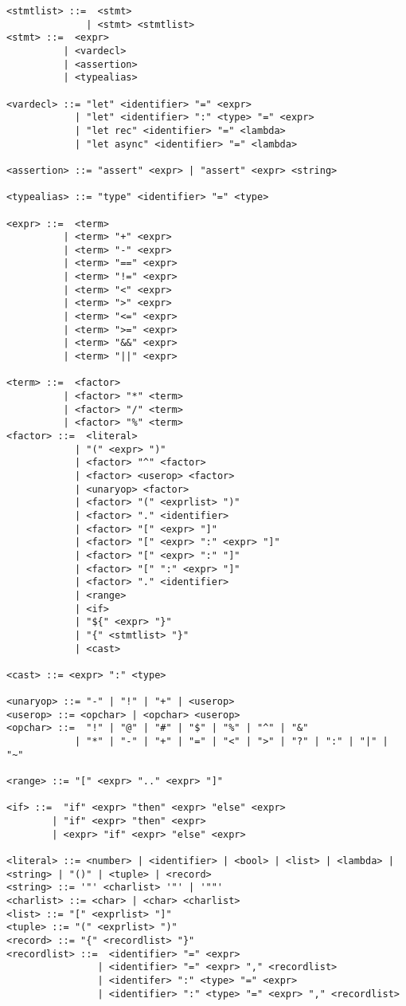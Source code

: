 \begin{verbatim}
<stmtlist> ::=  <stmt> 
              | <stmt> <stmtlist>
<stmt> ::=  <expr> 
          | <vardecl>
          | <assertion>
          | <typealias>

<vardecl> ::= "let" <identifier> "=" <expr>
            | "let" <identifier> ":" <type> "=" <expr>
            | "let rec" <identifier> "=" <lambda>
            | "let async" <identifier> "=" <lambda>

<assertion> ::= "assert" <expr> | "assert" <expr> <string>

<typealias> ::= "type" <identifier> "=" <type>

<expr> ::=  <term> 
          | <term> "+" <expr> 
          | <term> "-" <expr>
          | <term> "==" <expr>
          | <term> "!=" <expr>
          | <term> "<" <expr>
          | <term> ">" <expr>
          | <term> "<=" <expr>
          | <term> ">=" <expr>
          | <term> "&&" <expr>
          | <term> "||" <expr>
            
<term> ::=  <factor> 
          | <factor> "*" <term> 
          | <factor> "/" <term> 
          | <factor> "%" <term> 
<factor> ::=  <literal> 
            | "(" <expr> ")" 
            | <factor> "^" <factor>
            | <factor> <userop> <factor>
            | <unaryop> <factor>
            | <factor> "(" <exprlist> ")"
            | <factor> "." <identifier>
            | <factor> "[" <expr> "]"
            | <factor> "[" <expr> ":" <expr> "]"
            | <factor> "[" <expr> ":" "]"
            | <factor> "[" ":" <expr> "]"
            | <factor> "." <identifier>
            | <range>
            | <if>
            | "${" <expr> "}"
            | "{" <stmtlist> "}"
            | <cast>

<cast> ::= <expr> ":" <type>

<unaryop> ::= "-" | "!" | "+" | <userop>
<userop> ::= <opchar> | <opchar> <userop>
<opchar> ::=  "!" | "@" | "#" | "$" | "%" | "^" | "&" 
            | "*" | "-" | "+" | "=" | "<" | ">" | "?" | ":" | "|" | "~"

<range> ::= "[" <expr> ".." <expr> "]"

<if> ::=  "if" <expr> "then" <expr> "else" <expr>
        | "if" <expr> "then" <expr>
        | <expr> "if" <expr> "else" <expr>

<literal> ::= <number> | <identifier> | <bool> | <list> | <lambda> | <string> | "()" | <tuple> | <record>
<string> ::= '"' <charlist> '"' | '""'
<charlist> ::= <char> | <char> <charlist>
<list> ::= "[" <exprlist> "]"
<tuple> ::= "(" <exprlist> ")"
<record> ::= "{" <recordlist> "}"
<recordlist> ::=  <identifier> "=" <expr> 
                | <identifier> "=" <expr> "," <recordlist>
                | <identifer> ":" <type> "=" <expr> 
                | <identifier> ":" <type> "=" <expr> "," <recordlist>


\end{verbatim}
